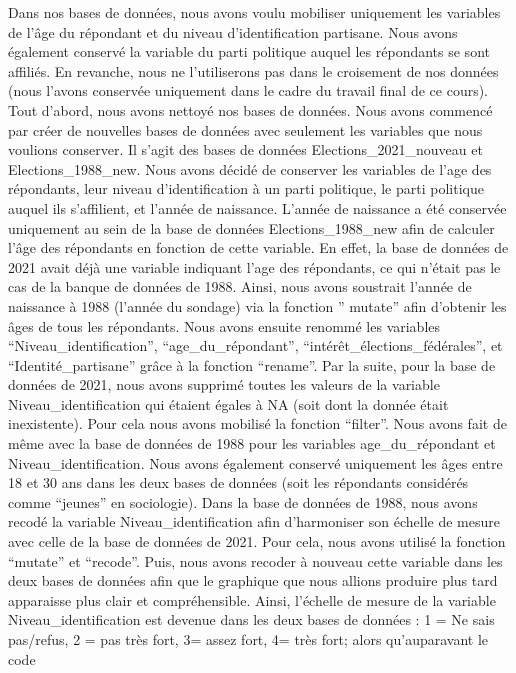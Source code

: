 \documentclass[
  letterpaper,
  DIV=11,
  numbers=noendperiod]{scrartcl}
\begin{document}
Dans nos bases de données, nous avons voulu mobiliser uniquement les
variables de l'âge du répondant et du niveau d'identification partisane.
Nous avons également conservé la variable du parti politique auquel les
répondants se sont affiliés. En revanche, nous ne l'utiliserons pas dans
le croisement de nos données (nous l'avons conservée uniquement dans le
cadre du travail final de ce cours). Tout d'abord, nous avons nettoyé
nos bases de données. Nous avons commencé par créer de nouvelles bases
de données avec seulement les variables que nous voulions conserver. Il
s'agit des bases de données Elections\_2021\_nouveau et
Elections\_1988\_new. Nous avons décidé de conserver les variables de
l'age des répondants, leur niveau d'identification à un parti politique,
le parti politique auquel ils s'affilient, et l'année de naissance.
L'année de naissance a été conservée uniquement au sein de la base de
données Elections\_1988\_new afin de calculer l'âge des répondants en
fonction de cette variable. En effet, la base de données de 2021 avait
déjà une variable indiquant l'age des répondants, ce qui n'était pas le
cas de la banque de données de 1988. Ainsi, nous avons soustrait l'année
de naissance à 1988 (l'année du sondage) via la fonction '' mutate''
afin d'obtenir les âges de tous les répondants. Nous avons ensuite
renommé les variables ``Niveau\_identification'',
``age\_du\_répondant'', ``intérêt\_élections\_fédérales'', et
``Identité\_partisane'' grâce à la fonction ``rename''. Par la suite,
pour la base de données de 2021, nous avons supprimé toutes les valeurs
de la variable Niveau\_identification qui étaient égales à NA (soit dont
la donnée était inexistente). Pour cela nous avons mobilisé la fonction
``filter''. Nous avons fait de même avec la base de données de 1988 pour
les variables age\_du\_répondant et Niveau\_identification. Nous avons
également conservé uniquement les âges entre 18 et 30 ans dans les deux
bases de données (soit les répondants considérés comme ``jeunes'' en
sociologie). Dans la base de données de 1988, nous avons recodé la
variable Niveau\_identification afin d'harmoniser son échelle de mesure
avec celle de la base de données de 2021. Pour cela, nous avons utilisé
la fonction ``mutate'' et ``recode''. Puis, nous avons recoder à nouveau
cette variable dans les deux bases de données afin que le graphique que
nous allions produire plus tard apparaisse plus clair et compréhensible.
Ainsi, l'échelle de mesure de la variable Niveau\_identification est
devenue dans les deux bases de données : 1 = Ne sais pas/refus, 2 = pas
très fort, 3= assez fort, 4= très fort; alors qu'auparavant le code
\end{document}
